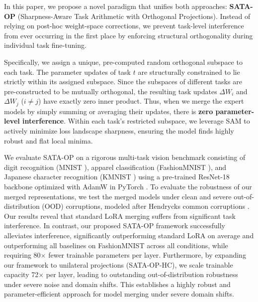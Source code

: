 \documentclass{article}
\theoremstyle{plain}
\theoremstyle{definition}
\theoremstyle{remark}
\begin{document}
In this paper, we propose a novel paradigm that unifies both approaches: \textbf{SATA-OP} (Sharpness-Aware Task Arithmetic with Orthogonal Projections). Instead of relying on post-hoc weight-space corrections, we prevent task-level interference from ever occurring in the first place by enforcing structural orthogonality during individual task fine-tuning.

Specifically, we assign a unique, pre-computed random orthogonal subspace to each task. The parameter updates of task $t$ are structurally constrained to lie strictly within its assigned subspace. Since the subspaces of different tasks are pre-constructed to be mutually orthogonal, the resulting task updates $\Delta W_i$ and $\Delta W_j$ ($i \neq j$) have exactly zero inner product. Thus, when we merge the expert models by simply summing or averaging their updates, there is \textbf{zero parameter-level interference}. Within each task's restricted subspace, we leverage SAM to actively minimize loss landscape sharpness, ensuring the model finds highly robust and flat local minima.

We evaluate SATA-OP on a rigorous multi-task vision benchmark consisting of digit recognition (MNIST \cite{lecun1998gradient}), apparel classification (FashionMNIST \cite{xiao2017fashion}), and Japanese character recognition (KMNIST \cite{clanuwat2018deep}) using a pre-trained ResNet-18 backbone \cite{he2016deep} optimized with AdamW \cite{loshchilov2017decoupled} in PyTorch \cite{paszke2019pytorch}. To evaluate the robustness of our merged representations, we test the merged models under clean and severe out-of-distribution (OOD) corruptions, modeled after Hendrycks common corruptions \cite{hendrycks2019benchmarking, hendrycks2021many}. Our results reveal that standard LoRA merging suffers from significant task interference. In contrast, our proposed SATA-OP framework successfully alleviates interference, significantly outperforming standard LoRA on average and outperforming all baselines on FashionMNIST across all conditions, while requiring 80$\times$ fewer trainable parameters per layer. Furthermore, by expanding our framework to unilateral projections (SATA-OP-HC), we scale trainable capacity 72$\times$ per layer, leading to outstanding out-of-distribution robustness under severe noise and domain shifts. This establishes a highly robust and parameter-efficient approach for model merging under severe domain shifts.
\end{document}
